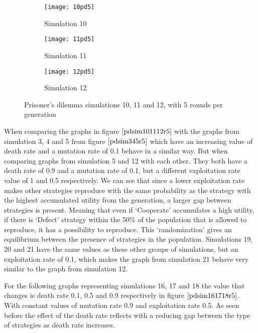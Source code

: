 \begin{figure}[H]       
    \centering
    \begin{subfigure}[b]{0.3\textwidth}
	\centering
	{\texttt{[image: 10pd5]}}   
    	\caption{Simulation 10}
	\label{fig:pds10}
    \end{subfigure}
    \hfill
    \begin{subfigure}[b]{0.3\textwidth}
	\centering
	{\texttt{[image: 11pd5]}}   
    	\caption{Simulation 11}
	\label{fig:pds11}
    \end{subfigure}
    \hfill
    \begin{subfigure}[b]{0.3\textwidth}
	\centering
	{\texttt{[image: 12pd5]}}   
    	\caption{Simulation 12}
	\label{fig:pds12}
    \end{subfigure}
    \caption{Prisoner's dilemma simulations 10, 11 and 12, with 5 rounds per generation}
    \label{pdsim101112r5}
\end{figure}

When comparing the graphs in figure $\ref{pdsim101112r5}$ with the graphs from simulation 3, 4 and 5 from figure $\ref{pdsim345r5}$ which have an increasing value of death rate and a mutation rate of 0.1 behave in a similar way. But when comparing graphs from simulation 5 and 12 with each other. They both have a death rate of 0.9 and a mutation rate of 0.1, but a different exploitation rate value of 1 and 0.5 respectively. We can see that since a lower exploitation rate makes other strategies reproduce with the same probability as the strategy with the highest accumulated utility from the generation, a larger gap between strategies is present. Meaning that even if `Cooperate' accumulates a high utility, if there is `Defect' strategy within the 50\% of the population that is allowed to reproduce, it has a possibility to reproduce. This `randomization' gives an equilibrium between the presence of strategies in the population. Simulations 19, 20 and 21 have the same values as these other groups of simulations, but an exploitation rate of 0.1, which makes the graph from simulation 21 behave very similar to the graph from simulation 12. 

For the following graphs representing simulations 16, 17 and 18 the value that changes is death rate 0.1, 0.5 and 0.9 respectively in figure $\ref{pdsim161718r5}$. With constant values of mutation rate  0.9 and exploitation rate 0.5. As seen before the effect of the death rate reflects with a reducing gap between the type of strategies as death rate increases. 
 
